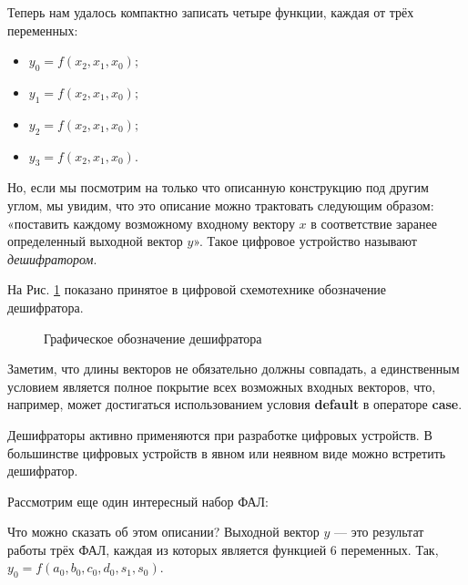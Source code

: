 \documentclass[a5paper, DIV=14, headings=openany, twoside=true,fontsize=10pt, titlepage]{scrreprt}
\newcommand{\quotes}[1]{«#1»}
\newcommand{\eng}[1]{\foreignlanguage{english}{#1}}
\newcommand{\kword}[1]{\eng{\textbf{#1}}}
\begin{document}


\par{Теперь нам удалось компактно записать четыре функции, каждая от трёх переменных:
\begin{itemize}[noitemsep,topsep=2pt,label={}]
  \item $y_0=f(x_2,x_1,x_0);$
  \item $y_1=f(x_2,x_1,x_0);$
  \item $y_2=f(x_2,x_1,x_0);$
  \item $y_3=f(x_2,x_1,x_0).$
\end{itemize}}

\par{Но, если мы посмотрим на только что описанную конструкцию под другим углом, мы увидим, что это описание можно трактовать следующим образом: \quotes{поставить каждому возможному входному вектору $x$ в соответствие заранее определенный выходной вектор $y$}. Такое цифровое устройство называют \emph{дешифратором}.}

\par{На Рис. \ref{fig:decoder} показано принятое в цифровой схемотехнике обозначение дешифратора.}

\begin{figure}[H]
  \centering
  \def\svgwidth{\columnwidth}
  
  \caption{Графическое обозначение дешифратора}
  \label{fig:decoder}
\end{figure}

\par{Заметим, что длины векторов не обязательно должны совпадать, а единственным условием является полное покрытие всех возможных входных векторов, что, например, может достигаться использованием условия \kword{default} в операторе \kword{case}.}

\par{Дешифраторы активно применяются при разработке цифровых устройств. В большинстве цифровых устройств в явном или неявном виде можно встретить дешифратор.}

\par{Рассмотрим еще один интересный набор ФАЛ:}



\par{Что можно сказать об этом описании? Выходной вектор $y$ — это результат работы трёх ФАЛ, каждая из которых является функцией 6 переменных. Так, $y_0 = f(a_0, b_0, c_0, d_0, s_1, s_0)$.}
\end{document}
